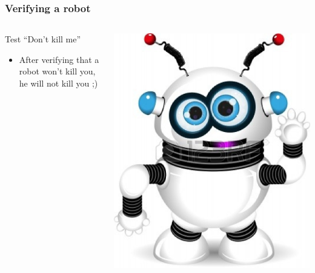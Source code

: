\documentclass{beamer}
\begin{document}
\begin{frame}
\frametitle{Verifying a robot}

    \begin{columns}[c] %
    \begin{block}{Test \color{red}``Don't kill me''}
    \begin{itemize}
      \item After verifying that a robot won't kill you, he will not kill you
      ;)
    \end{itemize}
    \end{block}
    \includegraphics[width=\textwidth]{../img/robot}
    \end{columns}
\end{frame}
\end{document}
